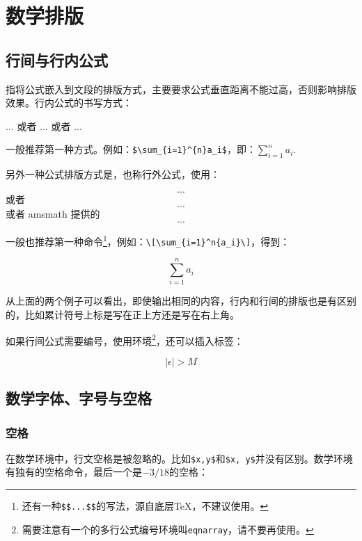\chapter{数学排版}
\section{行间与行内公式}
指将公式嵌入到文段的排版方式，主要要求公式垂直距离不能过高，否则影响排版效果。行内公式的书写方式：
\begin{latex}
$...$ 或者 \(...\) 或者 \begin{math}...\end{math}
\end{latex}

一般推荐第一种方式。例如：\verb|$\sum_{i=1}^{n}a_i$|，即：$\sum_{i=1}^{n}a_i$.

另外一种公式排版方式是，也称行外公式，使用：
\begin{latex}
\[...\] 或者 \begin{displaymath}...\end{displaymath}
或者 amsmath 提供的 \begin{equation*}...\end{equation*}
\end{latex}

一般也推荐第一种命令\footnote{还有一种\texttt{\$\$...\$\$}的写法，源自底层\TeX，不建议使用。}，例如：\verb|\[\sum_{i=1}^n{a_i}\]|，得到：

\[\sum_{i=1}^{n}a_i\]

从上面的两个例子可以看出，即使输出相同的内容，行内和行间的排版也是有区别的，比如累计符号上标是写在正上方还是写在右上角。

如果行间公式需要编号，使用环境\footnote{需要注意有一个的多行公式编号环境叫\texttt{eqnarray}，请不要再使用。}，还可以插入标签：

\begin{codeshow}
\begin{equation}
\label{eq:NoExample}
  |\epsilon|>M
\end{equation}
\end{codeshow}

\section{数学字体、字号与空格}
\label{sec:mathfont}
\subsection{空格}
在数学环境中，行文空格是被忽略的。比如\verb|$x,y$|和\verb|$x, y$|并没有区别。数学环境有独有的空格命令，最后一个是$-3/18$的空格：

